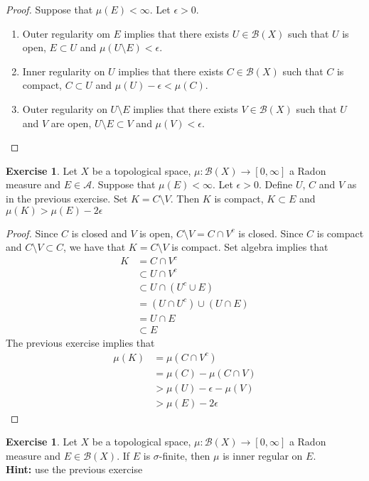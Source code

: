 \documentclass[12pt]{amsart}
\theoremstyle{definition}
\newtheorem{ex}[definition]{Exercise}
\newcommand{\ep}{\epsilon}
\newcommand{\sig}{\sigma}
\newcommand{\MA}{\mathcal{A}}
\newcommand{\MB}{\mathcal{B}}
\newcommand{\RG}{[0,\infty]}
\newcommand{\lex}[1]{\label{ex:#1}}
\begin{document}
	\begin{proof}
	Suppose that $\mu(E) < \infty$. Let $\ep >0$. 
	\begin{enumerate}
	\item Outer regularity om $E$ implies that there exists $U \in \MB(X)$ such that $U$ is open, $E \subset U$ and $\mu(U \setminus E) < \ep$. 
	\item Inner regularity on $U$ implies that there exists $C \in \MB(X)$ such that $C$ is compact, $C \subset U$ and $\mu(U) - \ep < \mu(C) $.
	\item Outer regularity on $U \setminus E$ implies that there exists $V \in \MB(X)$ such that $U$ and $V$ are open, $U \setminus E \subset V$ and $\mu(V) < \ep$.
	\end{enumerate}
	\end{proof}
	
	\begin{ex} \lex{00000} 
	Let $X$ be a topological space, $\mu: \MB(X) \rightarrow \RG$ a Radon measure and $E \in \MA$. Suppose that $\mu(E) < \infty$. Let $\ep >0$. Define $U$, $C$ and $V$ as in the previous exercise. Set $K = C \setminus V$. Then $K$ is compact, $K \subset E$ and $\mu(K) > \mu(E) - 2 \ep$ 
	\end{ex}
	
	\begin{proof}
	Since $C$ is closed and $V$ is open, $C \setminus V =  C \cap V^c$ is closed. Since $C$ is compact and $C \setminus V \subset C$, we have that $K = C \setminus V $ is compact.
	Set algebra implies that
	\begin{align*}
	K
	&= C \cap V^c \\
	& \subset U \cap V^c \\
	& \subset U \cap (U^c \cup E) \\
	&= (U \cap U^c) \cup (U \cap E) \\
	&=  U \cap E \\
	& \subset E
	\end{align*}
	The previous exercise implies that 
	\begin{align*}
	\mu(K)
	&= \mu(C \cap V^c) \\
	&= \mu(C) - \mu(C \cap V) \\
	&> \mu(U) - \ep - \mu(V) \\
	&> \mu(E) - 2 \ep
	\end{align*}
	\end{proof}		
	
	\begin{ex} \lex{00000} 
	Let $X$ be a topological space, $\mu: \MB(X) \rightarrow \RG$ a Radon measure and $E \in \MB(X)$. If $E$ is $\sig$-finite, then $\mu$ is inner regular on $E$. \\
	\textbf{Hint:} use the previous exercise
	\end{ex}
	
\end{document}
